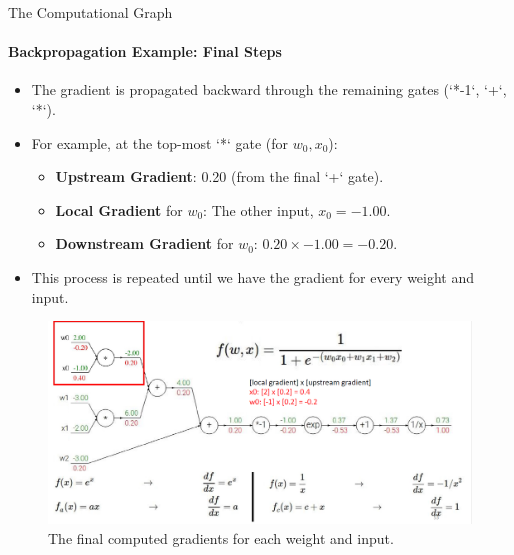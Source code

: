 \begin{frame}{The Computational Graph}
    \framesubtitle{Backpropagation Example: Final Steps}
    \begin{itemize}
        \item The gradient is propagated backward through the remaining gates (`*-1`, `+`, `*`).
        \item For example, at the top-most `*` gate (for $w_0, x_0$):
        \begin{itemize}
            \item \textbf{Upstream Gradient}: 0.20 (from the final `+` gate).
            \item \textbf{Local Gradient} for $w_0$: The other input, $x_0 = -1.00$.
            \item \textbf{Downstream Gradient} for $w_0$: $0.20 \times -1.00 = -0.20$.
        \end{itemize}
        \item This process is repeated until we have the gradient for every weight and input.
    \end{itemize}
    \begin{figure}
        \centering
        \includegraphics[width=\linewidth]{images/sigmoid_backprop_final.png}
        \caption{The final computed gradients for each weight and input.}
    \end{figure}
\end{frame}